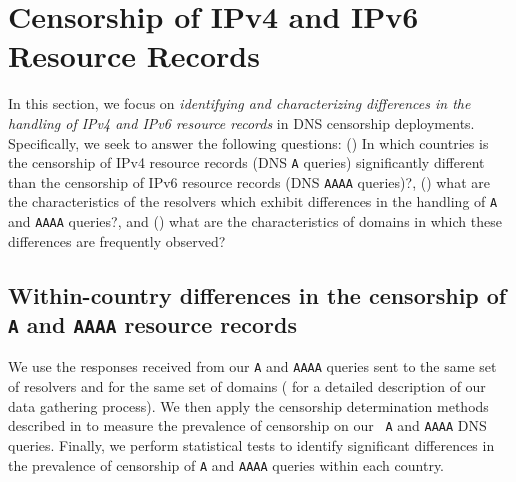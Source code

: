 \section{Censorship of IPv4 and IPv6 Resource Records} \label{sec:resources}

In this section, we focus on {\it identifying and characterizing differences in
the handling of IPv4 and IPv6 resource records} in DNS censorship deployments.
Specifically, we seek to answer the following questions: 
%
() In which countries is the censorship of IPv4
resource records (DNS {\tt A} queries) significantly different than the
censorship of IPv6 resource records (DNS {\tt AAAA} queries)?,
%
() what are the characteristics of the resolvers
which exhibit differences in the handling of {\tt A} and {\tt AAAA} queries?,
and 
%
() what are the characteristics of domains in which
these differences are frequently observed?
%

\subsection{Within-country differences in the censorship of
\texttt{A} and \texttt{AAAA} resource records} \label{sec:resources:country}
%
We use the responses received from our {\tt A} and {\tt AAAA} queries sent to
the same set of resolvers and for the same set of domains (\cf
{} for a detailed description of our data gathering
process). We then apply the censorship determination methods described in
 to measure the prevalence of censorship on our {\tt
A} and {\tt AAAA} DNS queries. Finally, we perform statistical tests to
identify significant differences in the prevalence of censorship of {\tt A} and
{\tt AAAA} queries within each country.

